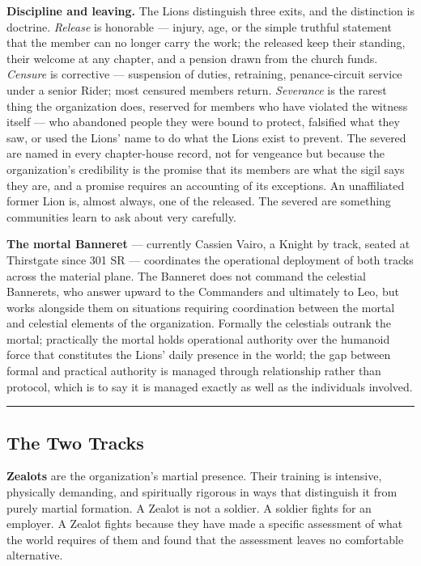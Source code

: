 \textbf{Discipline and leaving.} The Lions distinguish three exits, and the distinction is doctrine. \textit{Release} is honorable --- injury, age, or the simple truthful statement that the member can no longer carry the work; the released keep their standing, their welcome at any chapter, and a pension drawn from the church funds. \textit{Censure} is corrective --- suspension of duties, retraining, penance-circuit service under a senior Rider; most censured members return. \textit{Severance} is the rarest thing the organization does, reserved for members who have violated the witness itself --- who abandoned people they were bound to protect, falsified what they saw, or used the Lions' name to do what the Lions exist to prevent. The severed are named in every chapter-house record, not for vengeance but because the organization's credibility is the promise that its members are what the sigil says they are, and a promise requires an accounting of its exceptions. An unaffiliated former Lion is, almost always, one of the released. The severed are something communities learn to ask about very carefully.

\textbf{The mortal Banneret} --- currently Cassien Vairo, a Knight by track, seated at Thirstgate since 301 SR --- coordinates the operational deployment of both tracks across the material plane. The Banneret does not command the celestial Bannerets, who answer upward to the Commanders and ultimately to Leo, but works alongside them on situations requiring coordination between the mortal and celestial elements of the organization. Formally the celestials outrank the mortal; practically the mortal holds operational authority over the humanoid force that constitutes the Lions' daily presence in the world; the gap between formal and practical authority is managed through relationship rather than protocol, which is to say it is managed exactly as well as the individuals involved.

\medskip\hrule\medskip

\subsection{The Two Tracks}

\textbf{Zealots} are the organization's martial presence. Their training is intensive, physically demanding, and spiritually rigorous in ways that distinguish it from purely martial formation. A Zealot is not a soldier. A soldier fights for an employer. A Zealot fights because they have made a specific assessment of what the world requires of them and found that the assessment leaves no comfortable alternative.


